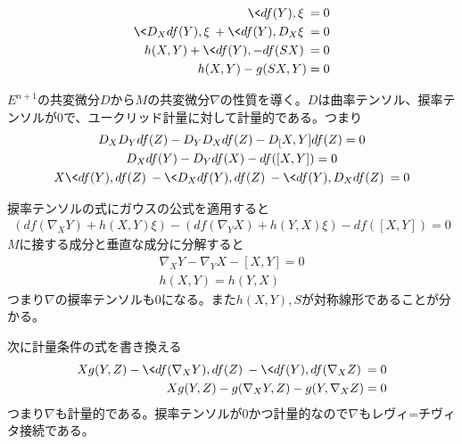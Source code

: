         \begin{align*}
            \<df(Y), \xi\> = 0\\
            \<D_Xdf(Y), \xi\> + \<df(Y), D_X\xi\> = 0\\
            h(X, Y) + \<df(Y), -df(SX)\> = 0\\
            h(X, Y) - g(SX, Y) = 0\\
        \end{align*}

        $E^{n+1}$の共変微分$D$から$M$の共変微分$\nabla$の性質を導く。$D$は曲率テンソル、捩率テンソルが0で、ユークリッド計量に対して計量的である。つまり
        \begin{gather*}
            D_XD_Ydf(Z) - D_YD_Xdf(Z) - D_[X, Y]df(Z) = 0\\
            D_Xdf(Y) - D_Ydf(X) - df([X, Y]) = 0\\
            X\<df(Y), df(Z)\> - \<D_Xdf(Y), df(Z)\> - \<df(Y), D_Xdf(Z)\> = 0\\
        \end{gather*}

        捩率テンソルの式にガウスの公式を適用すると
        \begin{align*}
            (df(\nabla_XY) + h(X, Y)\xi) - (df(\nabla_YX) + h(Y, X)\xi) - df([X, Y]) = 0
        \end{align*}
        $M$に接する成分と垂直な成分に分解すると
        \begin{gather*}
            \nabla_XY - \nabla_YX - [X, Y] = 0\\
            h(X, Y) = h(Y, X)
        \end{gather*}
        つまり$\nabla$の捩率テンソルも0になる。また$h(X, Y), S$が対称線形であることが分かる。

        次に計量条件の式を書き換える
        \begin{align*}
            Xg(Y, Z) - \<df(\nabla_XY), df(Z)\> - \<df(Y), df(\nabla_XZ)\> &= 0\\
            Xg(Y, Z) - g(\nabla_XY, Z) - g(Y, \nabla_XZ) &= 0\\
        \end{align*}
        つまり$\nabla$も計量的である。捩率テンソルが0かつ計量的なので$\nabla$もレヴィ=チヴィタ接続である。

